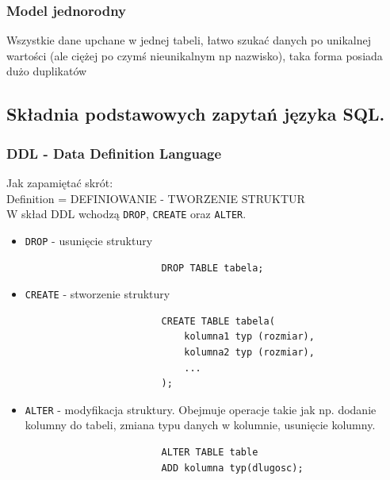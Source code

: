 \documentclass[a4paper,12pt,oneside]{book}
\begin{document}
			\subsubsection{Model jednorodny}
			Wszystkie dane upchane w jednej tabeli, łatwo szukać danych po unikalnej wartości (ale ciężej po czymś nieunikalnym np nazwisko), taka forma posiada dużo duplikatów
				
			\newpage\subsection{Składnia podstawowych zapytań języka SQL.}
				\subsubsection{DDL - Data Definition Language}
				\noindent Jak zapamiętać skrót: \\ Definition = DEFINIOWANIE - TWORZENIE STRUKTUR \\
				\noindent W skład DDL wchodzą \verb*|DROP|, \verb*|CREATE| oraz \verb*|ALTER|.
				\begin{itemize}
					\itemsep 0em
					\item \verb*|DROP| - usunięcie struktury
					\begin{verbatim}
						DROP TABLE tabela;
					\end{verbatim}
					\item \verb*|CREATE| - stworzenie struktury
					\begin{verbatim}
						CREATE TABLE tabela(
							kolumna1 typ (rozmiar),
							kolumna2 typ (rozmiar),
							...
						);
					\end{verbatim}
					\item \verb*|ALTER| - modyfikacja struktury. Obejmuje operacje takie jak np. dodanie kolumny do tabeli, zmiana typu danych w kolumnie, usunięcie kolumny.
					\begin{verbatim}
						ALTER TABLE table
						ADD kolumna typ(dlugosc);
					\end{verbatim}
					\begin{verbatim}
						
					\end{verbatim}
				\end{itemize}
				
				
\end{document}
